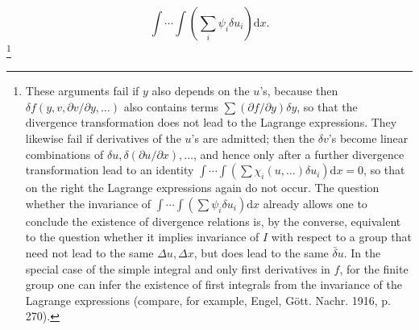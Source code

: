 \documentclass[11pt]{article}
\newcommand{\D}{\Delta}
\providecommand{\dd}{\mathrm d}
\providecommand{\bd}{\bar{\delta}}
\providecommand{\p}{\partial}
\begin{document}
\[
\int\!\cdots\!\int\left(\sum_i\psi_i\delta u_i\right)\dd x.
\]
\footnote{These arguments fail if \(y\) also depends on the \(u\)'s, because then \(\delta f(y,v,\p v/\p y,\ldots)\) also contains terms \(\sum(\p f/\p y)\delta y\), so that the divergence transformation does not lead to the Lagrange expressions. They likewise fail if derivatives of the \(u\)'s are admitted; then the \(\delta v\)'s become linear combinations of \(\delta u,\delta(\p u/\p x),\ldots\), and hence only after a further divergence transformation lead to an identity \(\int\!\cdots\!\int(\sum\chi_i(u,\ldots)\delta u_i)\dd x=0\), so that on the right the Lagrange expressions again do not occur. The question whether the invariance of \(\int\!\cdots\!\int(\sum\psi_i\delta u_i)\dd x\) already allows one to conclude the existence of divergence relations is, by the converse, equivalent to the question whether it implies invariance of \(I\) with respect to a group that need not lead to the same \(\D u,\D x\), but does lead to the same \(\bd u\). In the special case of the simple integral and only first derivatives in \(f\), for the finite group one can infer the existence of first integrals from the invariance of the Lagrange expressions (compare, for example, Engel, Gött. Nachr. 1916, p. 270).}
\end{document}
